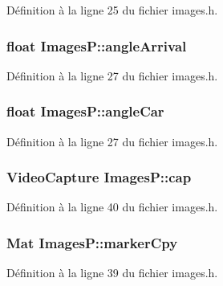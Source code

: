 Définition à la ligne 25 du fichier images.\-h.

\hypertarget{class_images_p_a408c61aeceb9175481adb2daca707a48}{
\subsubsection[{angle\-Arrival}]{\setlength{\rightskip}{0pt plus 5cm}float Images\-P\-::angle\-Arrival}}\label{class_images_p_a408c61aeceb9175481adb2daca707a48}


Définition à la ligne 27 du fichier images.\-h.

\hypertarget{class_images_p_a39c69bdd9469b4b8a2c9666e27afa7b0}{
\subsubsection[{angle\-Car}]{\setlength{\rightskip}{0pt plus 5cm}float Images\-P\-::angle\-Car}}\label{class_images_p_a39c69bdd9469b4b8a2c9666e27afa7b0}


Définition à la ligne 27 du fichier images.\-h.

\hypertarget{class_images_p_a143a67baa23fdc4b1c28beda0bd964f5}{
\subsubsection[{cap}]{\setlength{\rightskip}{0pt plus 5cm}Video\-Capture Images\-P\-::cap\hspace{0.3cm}{\ttfamily [private]}}}\label{class_images_p_a143a67baa23fdc4b1c28beda0bd964f5}


Définition à la ligne 40 du fichier images.\-h.

\hypertarget{class_images_p_adc6b2ffa6cbfab6c1b83ed4bef74f1b9}{
\subsubsection[{marker\-Cpy}]{\setlength{\rightskip}{0pt plus 5cm}Mat Images\-P\-::marker\-Cpy\hspace{0.3cm}{\ttfamily [private]}}}\label{class_images_p_adc6b2ffa6cbfab6c1b83ed4bef74f1b9}


Définition à la ligne 39 du fichier images.\-h.

